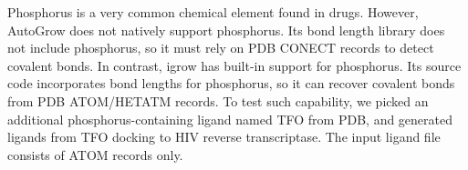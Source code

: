 \documentclass[10pt,conference,letterpaper]{IEEEtran}
\begin{document}

Phosphorus is a very common chemical element found in drugs. However, AutoGrow does not natively support phosphorus. Its bond length library does not include phosphorus, so it must rely on PDB CONECT records to detect covalent bonds. In contrast, igrow has built-in support for phosphorus. Its source code incorporates bond lengths for phosphorus, so it can recover covalent bonds from PDB ATOM/HETATM records. To test such capability, we picked an additional phosphorus-containing ligand named TFO from PDB, and generated ligands from TFO docking to HIV reverse transcriptase. The input ligand file consists of ATOM records only.
\end{document}

